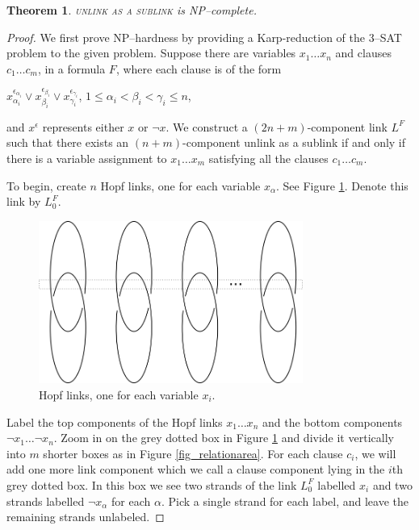 \documentclass[12pt]{amsart}
\newtheorem{thm}{Theorem}
\theoremstyle{definition}
\theoremstyle{remark}
\begin{document}
\begin{thm}
\textsc{unlink as a sublink} is NP--complete.
\label{thm_unlinksublink}
\end{thm}
\begin{proof}
We first prove NP--hardness by providing a Karp-reduction of the \textsc{3--SAT} problem to the given problem.
Suppose there are variables $x_1 \dots x_n$ and clauses $c_1\dots c_m$, in a formula $F$, where each clause is of the form
\begin{center}$x_{\alpha_i}^{\epsilon_{\alpha_i}} \vee x_{\beta_i}^{\epsilon_{\beta_i}} \vee x_{\gamma_i}^{\epsilon_{\gamma_i}}$, $1 \le \alpha_i < \beta_i < \gamma_i \le n$,
\end{center}

\noindent and $x^\epsilon$ represents either $x$ or $\neg x$.
We construct a $(2n+m)$-component link $L^F$ such that there exists an $(n+m)$-component unlink as a sublink if and only if there is a variable assignment to $x_1 \dots x_m$ satisfying all the clauses $c_1 \dots c_m$.


To begin, create $n$ Hopf links, one for each variable $x_\alpha$.
See Figure \ref{fig_hopf}.
Denote this link by $L_0^F$.

\begin{figure}[ht]
\centering
\includegraphics[height=2.1in]{hopfs.png}
\caption{Hopf links, one for each variable $x_i$.}
\label{fig_hopf}
\end{figure}




Label the top components of the Hopf links $x_1 \dots x_n$ and the bottom components $\neg x_1 \dots \neg x_n$.
Zoom in on the grey dotted box in Figure \ref{fig_hopf} and divide it vertically into $m$ shorter boxes as in Figure \ref{fig_relationarea}.
For each clause $c_i$, we will add one more link component which we call a clause component lying in the $i$th grey dotted box.
In this box we see two strands of the link $L_0^F$ labelled $x_i$ and two strands labelled $\neg x_\alpha$ for each $\alpha$.
Pick a single strand for each label, and leave the remaining strands unlabeled.



\end{proof}
\end{document}
